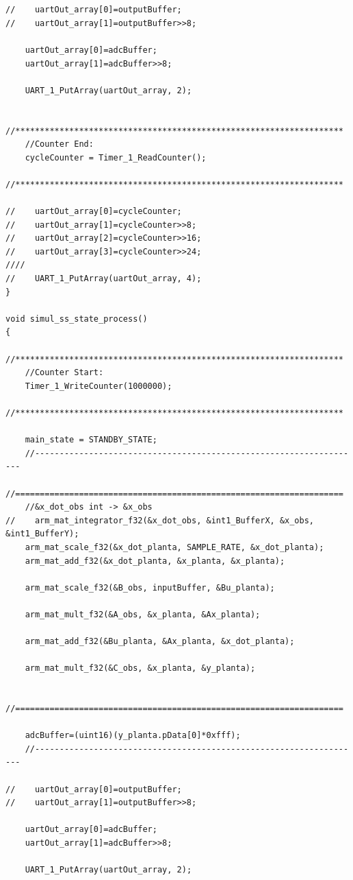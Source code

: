 \documentclass[
	article,			%
	11pt,				%
	oneside,			%
	a4paper,			%
	english,			%
	brazil,				%
	sumario=tradicional
	]{abntex2}
\begin{document}
\begin{apendicesenv}
\begin{lstlisting}
 
    
//    uartOut_array[0]=outputBuffer;
//    uartOut_array[1]=outputBuffer>>8;

    uartOut_array[0]=adcBuffer;
    uartOut_array[1]=adcBuffer>>8;
  
    UART_1_PutArray(uartOut_array, 2); 
  
    //*******************************************************************
    //Counter End:
    cycleCounter = Timer_1_ReadCounter(); 
    //******************************************************************* 
    
//    uartOut_array[0]=cycleCounter;
//    uartOut_array[1]=cycleCounter>>8;
//    uartOut_array[2]=cycleCounter>>16;
//    uartOut_array[3]=cycleCounter>>24;
////    
//    UART_1_PutArray(uartOut_array, 4);     
}

void simul_ss_state_process()
{
    //*******************************************************************
    //Counter Start:
    Timer_1_WriteCounter(1000000);
    //*******************************************************************
    
    main_state = STANDBY_STATE;      
    //-------------------------------------------------------------------
    //===================================================================             
    //&x_dot_obs int -> &x_obs
//    arm_mat_integrator_f32(&x_dot_obs, &int1_BufferX, &x_obs, &int1_BufferY);
    arm_mat_scale_f32(&x_dot_planta, SAMPLE_RATE, &x_dot_planta);
    arm_mat_add_f32(&x_dot_planta, &x_planta, &x_planta);
    
    arm_mat_scale_f32(&B_obs, inputBuffer, &Bu_planta);
    
    arm_mat_mult_f32(&A_obs, &x_planta, &Ax_planta);
    
    arm_mat_add_f32(&Bu_planta, &Ax_planta, &x_dot_planta);
    
    arm_mat_mult_f32(&C_obs, &x_planta, &y_planta);
     
    //===================================================================   
    
    adcBuffer=(uint16)(y_planta.pData[0]*0xfff);     
    //-------------------------------------------------------------------

//    uartOut_array[0]=outputBuffer;
//    uartOut_array[1]=outputBuffer>>8;

    uartOut_array[0]=adcBuffer;
    uartOut_array[1]=adcBuffer>>8;
  
    UART_1_PutArray(uartOut_array, 2); 


\end{lstlisting}
\end{apendicesenv}
\end{document}
